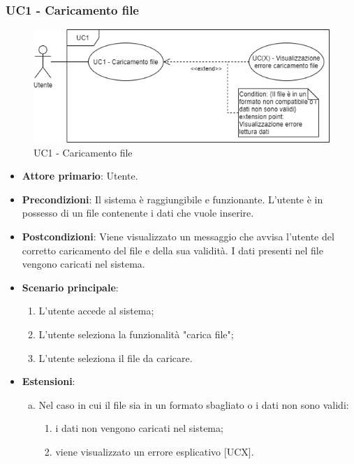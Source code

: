 \subsubsection{UC1 - Caricamento file}
\begin{figure}[h]
\includegraphics[width=\linewidth]{section/Images/UC1CaricamentoFile.png}
\centering
\caption{UC1 - Caricamento file}
\end{figure}
\begin{itemize}
	\item \textbf{Attore primario}: Utente.
	\item \textbf{Precondizioni}: Il sistema è raggiungibile e funzionante. L'utente è in possesso di un file contenente i dati che vuole inserire.
	\item \textbf{Postcondizioni}: Viene visualizzato un messaggio che avvisa l'utente del corretto caricamento del file e della sua validità. I dati presenti nel file vengono caricati nel sistema.
	\item \textbf{Scenario principale}:
		\begin{enumerate}
			\item L'utente accede al sistema;
			\item L'utente seleziona la funzionalità "carica file";
			\item L'utente seleziona il file da caricare.
		\end{enumerate}
	\item \textbf{Estensioni}:
	\begin{enumerate}[(a)]
		\item Nel caso in cui il file sia in un formato sbagliato o i dati non sono validi:
		\begin{enumerate}[1.]
			\item i dati non vengono caricati nel sistema;
			\item viene visualizzato un errore esplicativo [UCX].
		\end{enumerate}
	\end{enumerate}
\end{itemize}